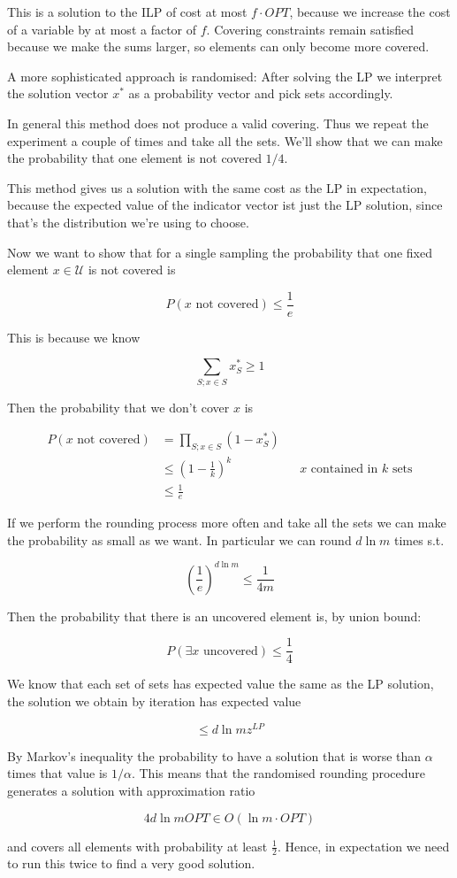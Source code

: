 This is a solution to the ILP of cost at most $f\cdot OPT$, because we increase the cost of a variable by at most a factor of $f$. Covering constraints remain satisfied because we make the sums larger, so elements can only become more covered.

A more sophisticated approach is randomised: After solving the LP we interpret the solution vector $x^*$ as a probability vector and pick sets accordingly.

In general this method does not produce a valid covering. Thus we repeat the experiment a couple of times and take all the sets. We'll show that we can make the probability that one element is not covered $1/4$.

This method gives us a solution with the same cost as the LP in expectation, because the expected value of the indicator vector ist just the LP solution, since that's the distribution we're using to choose.

Now we want to show that for a single sampling the probability that one fixed element $x\in \mathcal{U}$ is not covered is 

\[P(x \text{ not covered}) \leq \frac 1e\]

This is because we know

\[\sum_{S;x\in S} x_S^* \geq 1\]

Then the probability that we don't cover $x$ is 

\begin{align*}
P(x\text{ not covered})&=\prod_{S; x\in S} (1-x_S^*)\\
	&\leq  (1-\frac 1k)^k && \text{$x$ contained in $k$ sets}\\
	&\leq \frac 1e
\end{align*}

If we perform the rounding process more often and take all the sets we can make the probability as small as we want. In particular we can round $d\ln m$ times s.t.

\[\left(\frac 1e\right)^{d\ln m} \leq \frac {1}{4m}\]

Then the probability that there is an uncovered element is, by union bound:

\[P(\exists x \text{ uncovered}) \leq \frac{1}{4}\]

We know that each set of sets has expected value the same as the LP solution, the solution we obtain by iteration has expected value

\[\leq d\ln m z^{LP}\]

By Markov's inequality the probability to have a solution that is worse than $\alpha$ times that value is $1/\alpha$. This means that the randomised rounding procedure generates a solution with approximation ratio

\[ 4 d\ln m OPT \in O(\ln m \cdot OPT)\]

and covers all elements with probability at least $\frac 12$. Hence, in expectation we need to run this twice to find a very good solution.